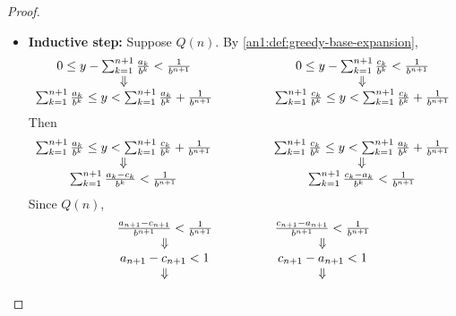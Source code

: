 \begin{proof}
\begin{itemize}
\[          \]
    \item \textbf{Inductive step:} Suppose $Q(n)$. By \cref{an1:def:greedy-base-expansion},
          \[
            \begin{array}{c@{\qquad\quad\qquad}c}
              0 \leq y - \sum_{k = 1}^{n + 1} \frac{a_{k}}{b^{k}} < \frac{1}{b^{n + 1}} &
              0 \leq y - \sum_{k = 1}^{n + 1} \frac{c_{k}}{b^{k}} < \frac{1}{b^{n + 1}}              \\
              \Downarrow                                                                & \Downarrow \\
              \sum_{k = 1}^{n + 1} \frac{a_{k}}{b^{k}} \leq y <
              \sum_{k = 1}^{n + 1} \frac{a_{k}}{b^{k}} + \frac{1}{b^{n + 1}}            &
              \sum_{k = 1}^{n + 1} \frac{c_{k}}{b^{k}} \leq y <
              \sum_{k = 1}^{n + 1} \frac{c_{k}}{b^{k}} + \frac{1}{b^{n + 1}}
            \end{array}
          \]
          Then
          \[
            \begin{array}{c@{\qquad\quad\qquad}c}
              \sum_{k = 1}^{n + 1} \frac{a_{k}}{b^{k}} \leq y <
              \sum_{k = 1}^{n + 1} \frac{c_{k}}{b^{k}} + \frac{1}{b^{n + 1}}         &
              \sum_{k = 1}^{n + 1} \frac{c_{k}}{b^{k}} \leq y <
              \sum_{k = 1}^{n + 1} \frac{a_{k}}{b^{k}} + \frac{1}{b^{n + 1}}                      \\
              \Downarrow                                                             & \Downarrow \\
              \sum_{k = 1}^{n + 1} \frac{a_{k} - c_{k}}{b^{k}} < \frac{1}{b^{n + 1}} &
              \sum_{k = 1}^{n + 1} \frac{c_{k} - a_{k}}{b^{k}} < \frac{1}{b^{n + 1}}              \\
            \end{array}
          \]
          Since $Q(n)$,
          \[
            \begin{array}{c@{\qquad\quad\qquad}c}
              \frac{a_{n + 1} - c_{n + 1}}{b^{n + 1}} < \frac{1}{b^{n + 1}} &
              \frac{c_{n + 1} - a_{n + 1}}{b^{n + 1}} < \frac{1}{b^{n + 1}}              \\
              \Downarrow                                                    & \Downarrow \\
              a_{n + 1} - c_{n + 1} < 1                                     &
              c_{n + 1} - a_{n + 1} < 1                                                  \\
              \Downarrow                                                    & \Downarrow \\

\end{array}\]
\end{itemize}
\end{proof}
